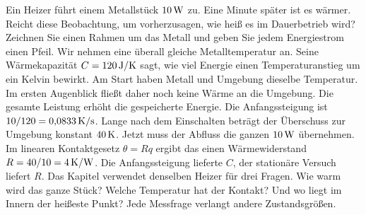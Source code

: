 Ein Heizer führt einem Metallstück \(10\,\mathrm{W}\) zu. Eine Minute später ist es wärmer. Reicht diese Beobachtung, um vorherzusagen, wie heiß es im Dauerbetrieb wird? Zeichnen Sie einen Rahmen um das Metall und geben Sie jedem Energiestrom einen Pfeil.
Wir nehmen eine überall gleiche Metalltemperatur an. Seine Wärmekapazität \(C=120\,\mathrm{J/K}\) sagt, wie viel Energie einen Temperaturanstieg um ein Kelvin bewirkt. Am Start haben Metall und Umgebung dieselbe Temperatur. Im ersten Augenblick fließt daher noch keine Wärme an die Umgebung. Die gesamte Leistung erhöht die gespeicherte Energie. Die Anfangssteigung ist \(10/120=0{,}0833\,\mathrm{K/s}\).
Lange nach dem Einschalten beträgt der Überschuss zur Umgebung konstant \(40\,\mathrm{K}\). Jetzt muss der Abfluss die ganzen \(10\,\mathrm{W}\) übernehmen. Im linearen Kontaktgesetz \(\theta=Rq\) ergibt das einen Wärmewiderstand \(R=40/10=4\,\mathrm{K/W}\). Die Anfangssteigung lieferte \(C\), der stationäre Versuch liefert \(R\).
Das Kapitel verwendet denselben Heizer für drei Fragen. Wie warm wird das ganze Stück? Welche Temperatur hat der Kontakt? Und wo liegt im Innern der heißeste Punkt? Jede Messfrage verlangt andere Zustandsgrößen.



